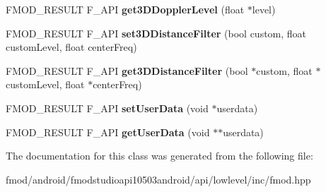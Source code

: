 \begin{DoxyCompactItemize}
\item 
\hypertarget{class_f_m_o_d_1_1_channel_control_a0b57ab9a75c712f06cde4cd83bb52401}{F\+M\+O\+D\+\_\+\+R\+E\+S\+U\+L\+T F\+\_\+\+A\+P\+I {\bfseries get3\+D\+Doppler\+Level} (float $\ast$level)}\label{class_f_m_o_d_1_1_channel_control_a0b57ab9a75c712f06cde4cd83bb52401}

\item 
\hypertarget{class_f_m_o_d_1_1_channel_control_a50cdfb6d2c4e85d3c5b44114925b3950}{F\+M\+O\+D\+\_\+\+R\+E\+S\+U\+L\+T F\+\_\+\+A\+P\+I {\bfseries set3\+D\+Distance\+Filter} (bool custom, float custom\+Level, float center\+Freq)}\label{class_f_m_o_d_1_1_channel_control_a50cdfb6d2c4e85d3c5b44114925b3950}

\item 
\hypertarget{class_f_m_o_d_1_1_channel_control_aff53b60321028184b7509c284e4fa67d}{F\+M\+O\+D\+\_\+\+R\+E\+S\+U\+L\+T F\+\_\+\+A\+P\+I {\bfseries get3\+D\+Distance\+Filter} (bool $\ast$custom, float $\ast$custom\+Level, float $\ast$center\+Freq)}\label{class_f_m_o_d_1_1_channel_control_aff53b60321028184b7509c284e4fa67d}

\item 
\hypertarget{class_f_m_o_d_1_1_channel_control_adf3e88adc768c9510527271074f6f4f5}{F\+M\+O\+D\+\_\+\+R\+E\+S\+U\+L\+T F\+\_\+\+A\+P\+I {\bfseries set\+User\+Data} (void $\ast$userdata)}\label{class_f_m_o_d_1_1_channel_control_adf3e88adc768c9510527271074f6f4f5}

\item 
\hypertarget{class_f_m_o_d_1_1_channel_control_ab3b41084c9c3411bd4560177186eca5d}{F\+M\+O\+D\+\_\+\+R\+E\+S\+U\+L\+T F\+\_\+\+A\+P\+I {\bfseries get\+User\+Data} (void $\ast$$\ast$userdata)}\label{class_f_m_o_d_1_1_channel_control_ab3b41084c9c3411bd4560177186eca5d}

\end{DoxyCompactItemize}


The documentation for this class was generated from the following file\+:\begin{DoxyCompactItemize}
\item 
fmod/android/fmodstudioapi10503android/api/lowlevel/inc/fmod.\+hpp\end{DoxyCompactItemize}
